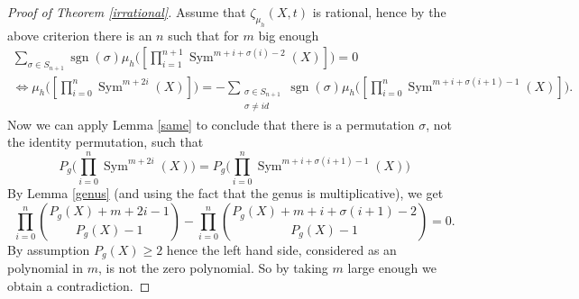 \documentclass[11pt, a4paper, german]{article}
\theoremstyle{plain}
\theoremstyle{definition}
\DeclareMathOperator{\Sym}{Sym}
\DeclareMathOperator{\sgn}{sgn}
\begin{document}
\begin{proof}[Proof of Theorem \ref{irrational}]
    Assume that $\zeta_{\mu_h}(X,t)$ is rational, hence by the above criterion there is an $n$ such that for $m$ big enough
    \begin{gather*}
        \sum_{\sigma \in S_{n+1}} \sgn(\sigma) \mu_h \Big(\left[ \prod_{i=1}^{n+1} \Sym^{m + i + \sigma(i) - 2}(X)\right]\Big)  = 0 \\ 
            \Leftrightarrow
            \mu_h \Big ( \left[ \prod_{i=0}^n \Sym^{m + 2i}(X) \right] \Big )  = - \sum_{\substack{\sigma \in S_{n+1} \\ \sigma \neq id}} 
            \sgn(\sigma) \mu_h \Big ( \left[\prod_{i=0}^n \Sym^{m + i + \sigma(i+1) - 1}(X) \right]\Big ).
    \end{gather*}
    Now we can apply Lemma \ref{same} to conclude that there is a permutation $\sigma$, not the identity permutation, such that
    \[
        P_g \Big(\prod_{i=0}^n \Sym^{m+2i}(X)\Big) = P_g \Big( \prod_{i=0}^n \Sym^{m+i+\sigma(i+1) - 1}(X) \Big)
    \]
    By Lemma \ref{genus} (and using the fact that the genus is multiplicative), we get
    \[
        \prod_{i=0}^n \binom{P_g(X) + m + 2i - 1}{P_g(X) - 1} - \prod_{i=0}^n \binom{P_g(X) + m + i + \sigma(i+1) - 2}{P_g(X) - 1} = 0.
    \]
    By assumption $P_g(X) \geq 2$ hence the left hand side, considered as an polynomial in $m$, is not the zero polynomial. So by taking
    $m$ large enough we obtain a contradiction.
\end{proof}

{}

\end{document}

